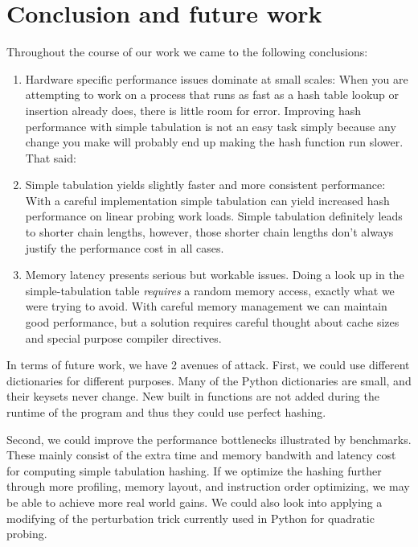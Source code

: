 \documentclass[11pt]{article}
\begin{document}
\section{Conclusion and future work}
Throughout the course of our work we came to the following conclusions:
\begin{enumerate}
\item Hardware specific performance issues dominate at small scales: When you
are attempting to work on a process that runs as fast as a hash table lookup or
insertion already does, there is little room for error.  Improving hash
performance with simple tabulation is not an easy task simply because any
change you make will probably end up making the hash function run slower.  That said:

\item Simple tabulation yields slightly faster and more consistent performance:
With a careful implementation simple tabulation can yield increased hash
performance on linear probing work loads. Simple tabulation definitely leads to
shorter chain lengths, however, those shorter chain lengths don’t always
justify the performance cost in all cases.

\item Memory latency presents serious but workable issues.  Doing a look up in the simple-tabulation table \emph{requires} a random memory access, exactly what we were trying to avoid. With careful memory management we can maintain good performance, but a solution requires careful thought about cache sizes and special purpose compiler directives.

\end{enumerate}

In terms of future work, we have 2 avenues of attack. First, we could use
different dictionaries for different purposes. Many of the Python dictionaries
are small, and their keysets never change. New built in functions are not added
during the runtime of the program and thus they could use perfect hashing.

Second, we could improve the performance bottlenecks illustrated by benchmarks.
These mainly consist of the extra time and memory bandwith and latency cost for
computing simple tabulation hashing.  If we optimize the hashing further
through more profiling, memory layout, and instruction order optimizing, we may
be able to achieve more real world gains.  We could also look into applying a
modifying of the perturbation trick currently used in Python for quadratic
probing.
\end{document}
